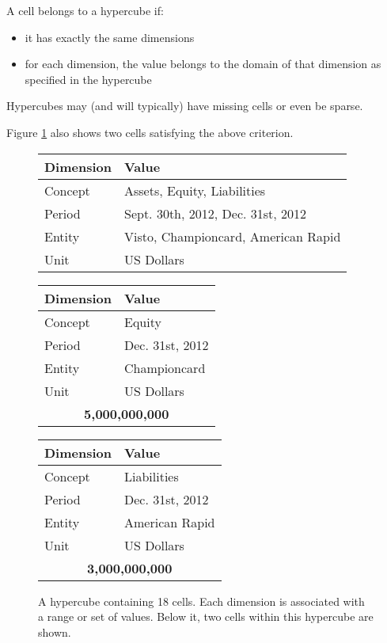 \documentclass{acm_proc_article-sp}
\begin{document}
A cell belongs to a hypercube if:

\begin{itemize}
\item it has exactly the same dimensions
\item for each dimension, the value belongs to the domain of that dimension as specified in the hypercube
\end{itemize}

Hypercubes may (and will typically) have missing cells or even be sparse.

Figure \ref{fig-hypercube} also shows two cells satisfying the above criterion.

\begin{figure}
\centering
\caption{A hypercube containing 18 cells. Each dimension is associated with a range or set of values. Below it, two cells within this hypercube are shown.}
\label{fig-hypercube}
\vspace{3mm}
\begin{tabular}{|l|l|}
\hline
Dimension & Value \\
\hline
Concept & Assets, Equity, Liabilities \\
Period & Sept. 30th, 2012, Dec. 31st, 2012 \\
Entity & Visto, Championcard, American Rapid \\
Unit & US Dollars \\
\hline
\end{tabular}

\begin{tabular}{|l|l|}
\hline
Dimension & Value \\
\hline
Concept & Equity \\
Period & Dec. 31st, 2012 \\
Entity & Championcard \\
Unit & US Dollars \\
\hline
\multicolumn{2}{|c|}{\textbf{5,000,000,000}} \\
\hline
\end{tabular}
\begin{tabular}{|l|l|}
\hline
Dimension & Value \\
\hline
Concept & Liabilities \\
Period & Dec. 31st, 2012 \\
Entity & American Rapid \\
Unit & US Dollars \\
\hline
\multicolumn{2}{|c|}{\textbf{3,000,000,000}} \\
\hline
\end{tabular}
\end{figure}
\end{document}
